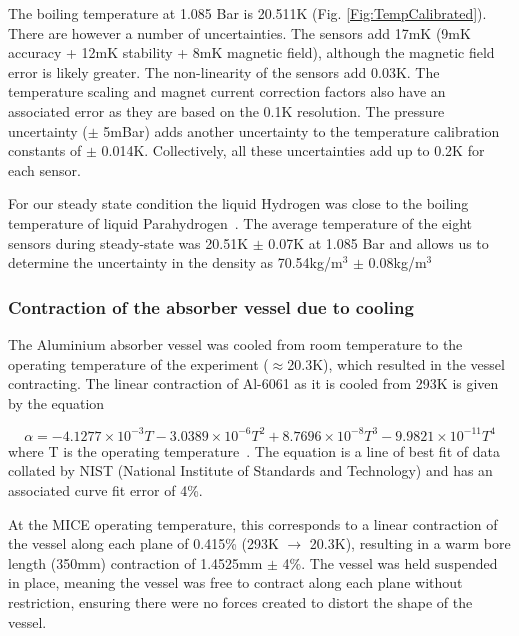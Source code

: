  The boiling temperature at 1.085 Bar is 20.511K (Fig. \ref{Fig:TempCalibrated}). There are however a number of uncertainties. The sensors add 17mK (9mK accuracy + 12mK stability + 8mK magnetic field), although the magnetic field error is likely greater. The non-linearity of the sensors add 0.03K. The temperature scaling and magnet current correction factors also have an associated error as they are based on the 0.1K resolution.
The pressure uncertainty ($\mathrm{\pm}$ 5mBar) adds another uncertainty to the temperature calibration constants of $\mathrm{\pm}$ 0.014K. Collectively, all these uncertainties add up to 0.2K for each sensor.
 
For our steady state condition the liquid Hydrogen was close to the boiling temperature of liquid Parahydrogen~\cite{NOTE524}. The average temperature of the eight sensors during steady-state was 20.51K $\mathrm{\pm}$ 0.07K at 1.085 Bar and allows us to determine the uncertainty in the density as 70.54kg/m${}^{3}$ $\mathrm{\pm}$ 0.08kg/m${}^{3}$
 

\subsubsection{Contraction of the absorber vessel due to cooling}
\label{SubSect:Absorber_Contraction}

The Aluminium absorber vessel was cooled from room temperature to the operating temperature of the
experiment ($\mathrm{\approx}$20.3K), which resulted in the vessel contracting. The linear contraction of
Al-6061 as it is cooled from 293K is given by the equation

\begin{equation}
  \alpha =-4.1277\times {10}^{-3}T-3.0389\times {10}^{-6}T^2+8.7696\times {10}^{-8}T^3-9.9821\times {10}^{-11}T^4
\end{equation}
where T is the operating temperature~\cite{Hardin}. The equation is a line of best fit of data collated by NIST
(National Institute of Standards and Technology) and has an associated curve fit error of 4\%.

At the MICE operating temperature, this corresponds to a linear contraction of the vessel along each plane of 0.415\%
(293K $\mathrm{\to}$ 20.3K), resulting in a warm bore length (350mm) contraction of 1.4525mm
$\mathrm{\pm}$ 4\%. The vessel was held suspended in place, meaning the vessel was free to contract along
each plane without restriction, ensuring there were no forces created to distort the shape of the vessel.


